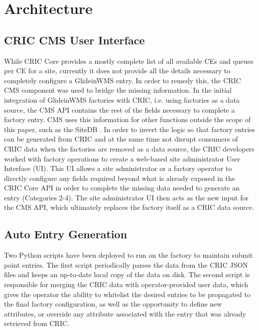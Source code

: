 \documentclass{webofc}
\begin{document}
\section{Architecture}
\label{arch}

\subsection{CRIC CMS User Interface}
\label{arch-cricui}

While CRIC Core provides a mostly complete list of all available CEs and queues per CE for a site, currently it does not provide all the details necessary to completely configure a GlideinWMS entry. In order to remedy this, the CRIC CMS component was used to bridge the missing information. In the initial integration of GlideinWMS factories with CRIC, i.e. using factories as a data source, the CMS API contains the rest of the fields necessary to complete a factory entry. CMS uses this information for other functions outside the scope of this paper, such as the SiteDB \cite{SiteDB}. In order to invert the logic so that factory entries can be generated from CRIC and at the same time not disrupt consumers of CRIC data when the factories are removed as a data source, the CRIC developers worked with factory operations to create a web-based site administrator User Interface (UI). This UI allows a site administrator or a factory operator to directly configure any fields required beyond what is already exposed in the CRIC Core API in order to complete the missing data needed to generate an entry (Categories 2-4). The site administrator UI then acts as the new input for the CMS API, which ultimately replaces the factory itself as a CRIC data source.

\subsection{Auto Entry Generation}
\label{arch-autoentry}

Two Python scripts have been deployed to run on the factory to maintain submit point entries. The first script 
periodically parses the data from the CRIC JSON files and keeps an up-to-date local copy of the data on disk. The second script
is responsible for merging the CRIC data with operator-provided user data, which gives the operator the ability to whitelist the desired entries to be propagated to the final factory configuration, as well as the opportunity to define new attributes, or override any attribute associated with the entry that was already retrieved from CRIC.
\end{document}
